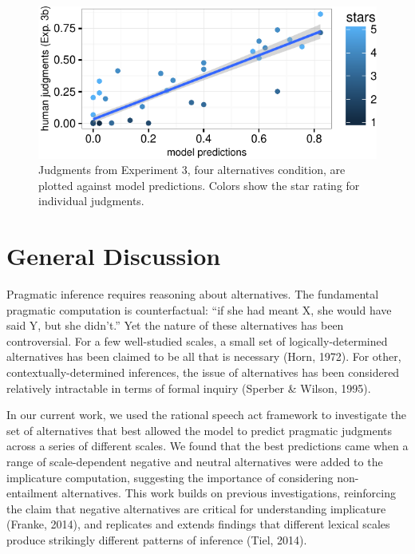 \documentclass[10pt, letterpaper]{article}
\newenvironment{CodeChunk}{}{}
\begin{document}
\begin{CodeChunk}
\begin{figure}[t]

{\centering \includegraphics{figs/fiveAltsScatter-1} 

}

\caption[Judgments from Experiment 3, four alternatives condition, are plotted against model predictions]{Judgments from Experiment 3, four alternatives condition, are plotted against model predictions. Colors show the star rating for individual judgments.}\label{fig:fiveAltsScatter}
\end{figure}
\end{CodeChunk}

\section{General Discussion}\label{general-discussion}

Pragmatic inference requires reasoning about alternatives. The
fundamental pragmatic computation is counterfactual: ``if she had meant
X, she would have said Y, but she didn't.'' Yet the nature of these
alternatives has been controversial. For a few well-studied scales, a
small set of logically-determined alternatives has been claimed to be
all that is necessary (Horn, 1972). For other, contextually-determined
inferences, the issue of alternatives has been considered relatively
intractable in terms of formal inquiry (Sperber \& Wilson, 1995).

In our current work, we used the rational speech act framework to
investigate the set of alternatives that best allowed the model to
predict pragmatic judgments across a series of different scales. We
found that the best predictions came when a range of scale-dependent
negative and neutral alternatives were added to the implicature
computation, suggesting the importance of considering non-entailment
alternatives. This work builds on previous investigations, reinforcing
the claim that negative alternatives are critical for understanding
implicature (Franke, 2014), and replicates and extends findings that
different lexical scales produce strikingly different patterns of
inference (Tiel, 2014).
\end{document}
